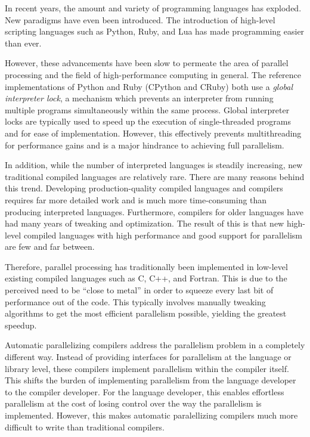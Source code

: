 \documentclass[abstracton]{scrartcl}
\begin{document}
In recent years, the amount and variety of programming languages has exploded. New paradigms have even been introduced. The introduction of high-level scripting languages such as Python, Ruby, and Lua has made programming easier than ever.

However, these advancements have been slow to permeate the area of parallel processing and the field of high-performance computing in general. The reference implementations of Python and Ruby (CPython and CRuby) both use a \emph{global interpreter lock}, a mechanism which prevents an interpreter from running multiple programs simultaneously within the same process. Global interpreter locks are typically used to speed up the execution of single-threaded programs and for ease of implementation. However, this effectively prevents multithreading for performance gains and is a major hindrance to achieving full parallelism.

In addition, while the number of interpreted languages is steadily increasing, new traditional compiled languages are relatively rare. There are many reasons behind this trend. Developing production-quality compiled languages and compilers requires far more detailed work and is much more time-consuming than producing interpreted languages. Furthermore, compilers for older languages have had many years of tweaking and optimization. The result of this is that new high-level compiled languages with high performance and good support for parallelism are few and far between.

Therefore, parallel processing has traditionally been implemented in low-level existing compiled languages such as C, C++, and Fortran. This is due to the perceived need to be ``close to metal'' in order to squeeze every last bit of performance out of the code. This typically involves manually tweaking algorithms to get the most efficient parallelism possible, yielding the greatest speedup.

Automatic parallelizing compilers address the parallelism problem in a completely different way. Instead of providing interfaces for parallelism at the language or library level, these compilers implement parallelism within the compiler itself. This shifts the burden of implementing parallelism from the language developer to the compiler developer. For the language developer, this enables effortless parallelism at the cost of losing control over the way the parallelism is implemented. However, this makes automatic paralellizing compilers much more difficult to write than traditional compilers.
\end{document}
